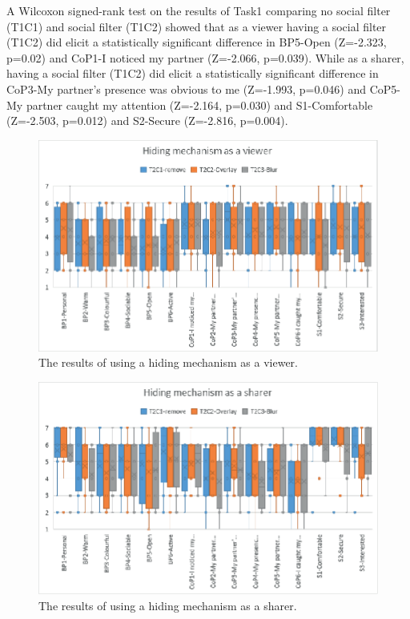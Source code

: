 A Wilcoxon signed-rank test on the results of Task1 comparing no social filter (T1C1) and social filter (T1C2) showed that as a viewer having a social filter (T1C2) did elicit a statistically significant difference in BP5-Open (Z=-2.323, p=0.02) and CoP1-I noticed my partner (Z=-2.066, p=0.039). While as a sharer, having a social filter (T1C2) did elicit a statistically significant difference in CoP3-My partner's presence was obvious to me (Z=-1.993, p=0.046) and CoP5-My partner caught my attention (Z=-2.164, p=0.030) and S1-Comfortable (Z=-2.503, p=0.012) and S2-Secure (Z=-2.816, p=0.004).

\begin{figure}
\begin{center}
\includegraphics[width=0.9\linewidth]{images/frontier18/images-05.eps}
\caption{The results of using a hiding mechanism as a viewer.}\label{fig:frontier18:result-hiding-viewer}
\end{center}
\end{figure}

\begin{figure}
\begin{center}
\includegraphics[width=0.9\linewidth]{images/frontier18/images-06.eps}
\caption{The results of using a hiding mechanism as a sharer.}\label{fig:frontier18:result-hiding-sharer}
\end{center}
\end{figure}

